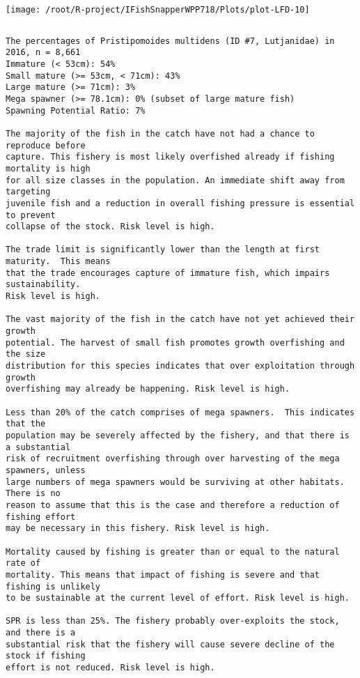 \documentclass{report}\usepackage[]{graphicx}\usepackage[]{color}
\makeatletter
\def\maxwidth{ %
  \ifdim\Gin@nat@width>\linewidth
    \linewidth
  \else
    \Gin@nat@width
  \fi
}
\newenvironment{kframe}{%
 \def\at@end@of@kframe{}%
 \ifinner\ifhmode%
  \def\at@end@of@kframe{\end{minipage}}%
  \begin{minipage}{\columnwidth}%
 \fi\fi%
 \def\FrameCommand##1{\hskip\@totalleftmargin \hskip-\fboxsep
 \colorbox{shadecolor}{##1}\hskip-\fboxsep
     \hskip-\linewidth \hskip-\@totalleftmargin \hskip\columnwidth}%
 \MakeFramed {\advance\hsize-\width
   \@totalleftmargin\z@ \linewidth\hsize
   \@setminipage}}%
 {\par\unskip\endMakeFramed%
 \at@end@of@kframe}
\newenvironment{knitrout}{}{} %
\makeatother
\begin{document}
\begin{knitrout}
\texttt{[image: /root/R-project/IFishSnapperWPP718/Plots/plot-LFD-10]} 
\begin{kframe}\begin{verbatim}
\end{verbatim}
\end{kframe}
\clearpage
\newpage
\begin{kframe}\begin{verbatim}The percentages of Pristipomoides multidens (ID #7, Lutjanidae) in 2016, n = 8,661
Immature (< 53cm): 54%
Small mature (>= 53cm, < 71cm): 43%
Large mature (>= 71cm): 3%
Mega spawner (>= 78.1cm): 0% (subset of large mature fish)
Spawning Potential Ratio: 7%
 
The majority of the fish in the catch have not had a chance to reproduce before
capture. This fishery is most likely overfished already if fishing mortality is high
for all size classes in the population. An immediate shift away from targeting
juvenile fish and a reduction in overall fishing pressure is essential to prevent
collapse of the stock. Risk level is high.

The trade limit is significantly lower than the length at first maturity.  This means
that the trade encourages capture of immature fish, which impairs sustainability.
Risk level is high.

The vast majority of the fish in the catch have not yet achieved their growth
potential. The harvest of small fish promotes growth overfishing and the size
distribution for this species indicates that over exploitation through growth
overfishing may already be happening. Risk level is high.

Less than 20% of the catch comprises of mega spawners.  This indicates that the
population may be severely affected by the fishery, and that there is a substantial
risk of recruitment overfishing through over harvesting of the mega spawners, unless
large numbers of mega spawners would be surviving at other habitats. There is no
reason to assume that this is the case and therefore a reduction of fishing effort
may be necessary in this fishery. Risk level is high.
 
Mortality caused by fishing is greater than or equal to the natural rate of
mortality. This means that impact of fishing is severe and that fishing is unlikely
to be sustainable at the current level of effort. Risk level is high.
 
SPR is less than 25%. The fishery probably over-exploits the stock, and there is a
substantial risk that the fishery will cause severe decline of the stock if fishing
effort is not reduced. Risk level is high.
 

\end{verbatim}
\end{kframe}
\end{knitrout}
\end{document}
